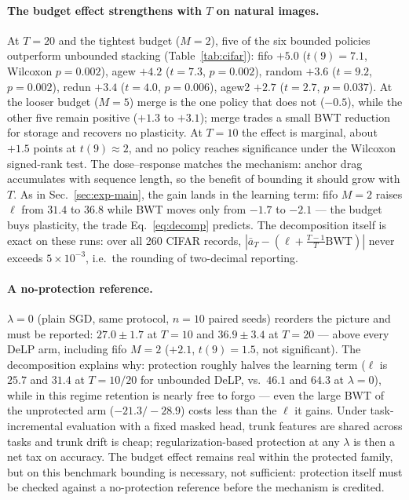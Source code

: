 \documentclass[review,12pt,number]{elsarticle}
\newcommand{\delp}{DeLP}
\begin{document}
\begin{sloppypar}
\paragraph{The budget effect strengthens with $T$ on natural images.}
At $T{=}20$ and the tightest budget ($M{=}2$), five of the six bounded
policies outperform unbounded stacking (Table~\ref{tab:cifar}): fifo $+5.0$
($t(9){=}7.1$, Wilcoxon $p{=}0.002$), agew $+4.2$ ($t{=}7.3$, $p{=}0.002$),
random $+3.6$ ($t{=}9.2$, $p{=}0.002$), redun $+3.4$ ($t{=}4.0$,
$p{=}0.006$), agew2 $+2.7$ ($t{=}2.7$, $p{=}0.037$).
At the looser budget ($M{=}5$) merge is the one policy that does not
($-0.5$), while the other five remain positive ($+1.3$ to $+3.1$); merge
trades a small BWT reduction for storage and recovers no plasticity.
At $T{=}10$ the effect is marginal, about $+1.5$ points at
$t(9)\approx 2$, and no policy reaches significance under the Wilcoxon
signed-rank test.
The dose--response matches the mechanism: anchor drag accumulates
with sequence length, so the benefit of bounding it should grow with
$T$. As in Sec.~\ref{sec:exp-main}, the gain lands in the learning
term: fifo $M{=}2$ raises $\ell$ from $31.4$ to $36.8$ while BWT
moves only from $-1.7$ to $-2.1$ --- the budget buys plasticity, the
trade Eq.~\ref{eq:decomp} predicts. The decomposition itself is exact
on these runs: over all 260 CIFAR records,
$|\bar a_T - (\ell + \frac{T-1}{T}\mathrm{BWT})|$ never exceeds
$5\times10^{-3}$, i.e.\ the rounding of two-decimal reporting.
\end{sloppypar}

\paragraph{A no-protection reference.}
$\lambda{=}0$ (plain SGD, same protocol, $n{=}10$ paired seeds)
reorders the picture and must be reported: $27.0\pm1.7$ at $T{=}10$
and $36.9\pm3.4$ at $T{=}20$ --- above every \delp{} arm, including
fifo $M{=}2$ ($+2.1$, $t(9){=}1.5$, not significant). The
decomposition explains why: protection roughly halves the learning
term ($\ell$ is $25.7$ and $31.4$ at $T{=}10/20$ for unbounded \delp{},
vs.\ $46.1$ and $64.3$ at $\lambda{=}0$), while in this regime
retention is nearly free to
forgo --- even the large BWT of the unprotected arm ($-21.3/-28.9$)
costs less than the $\ell$ it gains. Under task-incremental evaluation
with a fixed masked head, trunk features are shared across tasks and
trunk drift is cheap; regularization-based protection at any $\lambda$
is then a net tax on accuracy. The budget effect remains real within
the protected family, but on this benchmark bounding is necessary, not
sufficient: protection itself must be checked against a no-protection
reference before the mechanism is credited.
\end{document}
